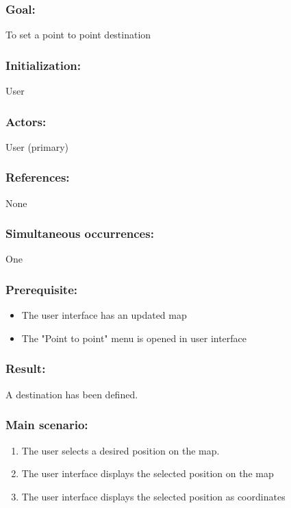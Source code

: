 \subsubsection*{Goal:}
To set a point to point destination

\subsubsection*{Initialization:}
User

\subsubsection*{Actors:}
User (primary)

\subsubsection*{References:}
None

\subsubsection*{Simultaneous occurrences:}
One

\subsubsection*{Prerequisite:}
\begin{itemize}
	\item The user interface has an updated map
	\item The "Point to point" menu is opened in user interface
\end{itemize}

\subsubsection*{Result:}
A destination has been defined.

\subsubsection*{Main scenario:}
\begin{enumerate}
	\item The user selects a desired position on the map.
	\item \label{uc4.2} The user interface displays the selected position on the map
	\item The user interface displays the selected position as coordinates
\end{enumerate}	

